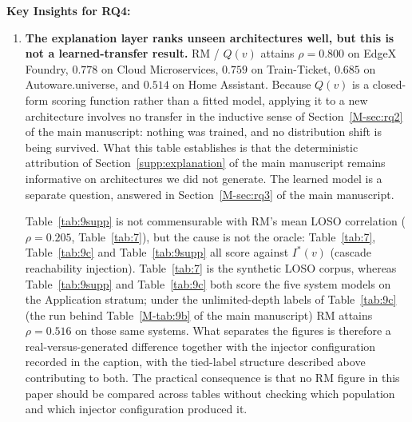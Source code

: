 \documentclass[preprint,3p]{elsarticle}
\begin{document}
\noindent\textbf{Key Insights for RQ4:}
\begin{enumerate}
    \item \textbf{The explanation layer ranks unseen architectures well, but this is not a learned-transfer result.} RM / $Q(v)$ attains $\rho = 0.800$ on EdgeX Foundry, $0.778$ on Cloud Microservices, $0.759$ on Train-Ticket, $0.685$ on Autoware.universe, and $0.514$ on Home Assistant. Because $Q(v)$ is a closed-form scoring function rather than a fitted model, applying it to a new architecture involves no transfer in the inductive sense of Section~\ref{M-sec:rq2} of the main manuscript: nothing was trained, and no distribution shift is being survived. What this table establishes is that the deterministic attribution of Section~\ref{supp:explanation} of the main manuscript remains informative on architectures we did not generate. The learned model is a separate question, answered in Section~\ref{M-sec:rq3} of the main manuscript.

    Table~\ref{tab:9supp} is not commensurable with RM's mean LOSO correlation ($\rho = 0.205$, Table~\ref{tab:7}), but the cause is not the oracle: Table~\ref{tab:7}, Table~\ref{tab:9c} and Table~\ref{tab:9supp} all score against $I^*(v)$ (cascade reachability injection). Table~\ref{tab:7} is the synthetic LOSO corpus, whereas Table~\ref{tab:9supp} and Table~\ref{tab:9c} both score the five system models on the Application stratum; under the unlimited-depth labels of Table~\ref{tab:9c} (the run behind Table~\ref{M-tab:9b} of the main manuscript) RM attains $\rho = 0.516$ on those same systems. What separates the figures is therefore a real-versus-generated difference together with the injector configuration recorded in the caption, with the tied-label structure described above contributing to both. The practical consequence is that no RM figure in this paper should be compared across tables without checking which population and which injector configuration produced it.


\end{enumerate}
\end{document}
